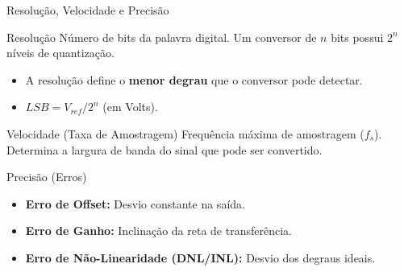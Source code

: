 \documentclass{beamer}
\begin{document}
\begin{frame}{Resolução, Velocidade e Precisão}
    \begin{block}{Resolução}
        Número de bits da palavra digital. Um conversor de $n$ bits possui $2^n$ níveis de quantização.
        \begin{itemize}
            \item A resolução define o \textbf{menor degrau} que o conversor pode detectar.
            \item $LSB = V_{ref} / 2^n$ (em Volts).
        \end{itemize}
    \end{block}
    \begin{block}{Velocidade (Taxa de Amostragem)}
        Frequência máxima de amostragem ($f_s$). Determina a largura de banda do sinal que pode ser convertido.
    \end{block}
    \begin{block}{Precisão (Erros)}
        \begin{itemize}
            \item \textbf{Erro de Offset:} Desvio constante na saída.
            \item \textbf{Erro de Ganho:} Inclinação da reta de transferência.
            \item \textbf{Erro de Não-Linearidade (DNL/INL):} Desvio dos degraus ideais.
        \end{itemize}
    \end{block}
\end{frame}
\end{document}
